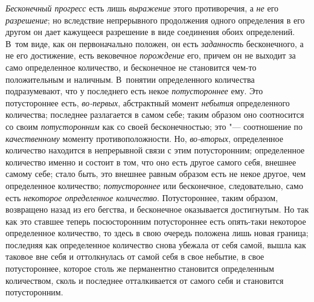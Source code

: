 {\em Бесконечный прогресс} есть лишь
{\em выражение} этого противоречия, а
{\em не} его {\em разрешение}; но
вследствие непрерывного продолжения одного определения в его другом он дает
кажущееся разрешение в виде соединения обоих определений. В~том виде, как
он первоначально положен, он есть {\em заданность}
бесконечного, а не его достижение, есть вековечное
{\em порождение} его, причем он не выходит за само
определенное количество, и бесконечное не становится чем-то положительным и
наличным. В~понятии определенного количества подразумевают, что у
последнего есть некое {\em потустороннее} ему. Это
потустороннее есть, {\em во-первых}, абстрактный момент
{\em небытия} определенного количества; последнее
разлагается в самом себе; таким образом оно соотносится со своим
{\em потусторонним} как со своей бесконечностью; это
"--- соотношение по {\em качественному} моменту
противоположности. Но, {\em во-вторых}, определенное
количество находится в непрерывной связи с этим потусторонним; определенное
количество именно и состоит в том, что оно есть другое самого себя, внешнее
самому себе; стало быть, это внешнее равным образом есть не некое другое,
чем определенное количество; {\em потустороннее} или
бесконечное, следовательно, само есть {\em некоторое
определенное количество}. Потустороннее, таким образом, возвращено назад из
его бегства, и бесконечное оказывается достигнутым. Но так как это ставшее
теперь посюсторонним потустороннее есть опять-таки некоторое определенное
количество, то здесь в свою очередь положена лишь новая граница; последняя
как определенное количество снова убежала от себя самой, вышла как таковое
вне себя и оттолкнулась от самой себя в свое небытие, в свое потустороннее,
которое столь же перманентно становится определенным количеством, сколь и
последнее отталкивается от самого себя и становится потусторонним.

